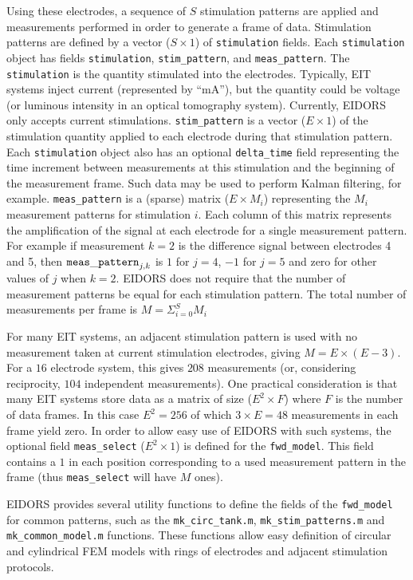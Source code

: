 \documentclass[12pt]{iopart}
\begin{document}
Using these electrodes, a sequence of $S$ stimulation
patterns are applied and measurements performed
in order to generate a frame of data.
Stimulation patterns are defined by a vector
($S\times1$) of {\tt stimulation} fields. Each
{\tt stimulation} object has fields
{\tt stimulation}, 
{\tt stim\_pattern}, and
{\tt meas\_pattern}. The {\tt stimulation} is
the quantity stimulated into the electrodes. Typically,
EIT systems inject current (represented by ``mA''),
but the quantity could be voltage (or luminous
intensity in an optical tomography system). Currently,
EIDORS only accepts current stimulations.
{\tt stim\_pattern} is a vector ($E\times1$)
of the stimulation quantity applied to each electrode
during that stimulation pattern.
Each {\tt stimulation} object also has an optional 
{\tt delta\_time} field representing the time increment
between measurements at this stimulation and the beginning
of the measurement frame. Such data may be used to perform
Kalman filtering, for example.
{\tt meas\_pattern} is a (sparse) matrix ($E{\times}M_i$) 
representing the $M_i$ measurement patterns for
stimulation $i$. Each column of this matrix represents
the amplification of the signal at each electrode for
a single measurement pattern. For example if measurement
$k=2$ is the difference signal between electrodes 4 and 5,
then ${\tt meas\_pattern}_{j,k}$ is $1$ for $j=4$,  $-1$
for $j=5$ and zero for other values of $j$ when $k=2$.
EIDORS does not require that the number of measurement
patterns be equal for each stimulation pattern. 
The total number of measurements per frame is
$ M = \Sigma_{i=0}^{S} M_i$

For many EIT systems, an adjacent stimulation
pattern is used with no measurement taken at current
stimulation electrodes, giving $M = E\times(E-3)$.
For a $16$ electrode system, this gives $208$
measurements (or, considering reciprocity, $104$ independent
measurements). One practical consideration is that
many EIT systems store data as a matrix of size
($E^2{\times}F$) where $F$ is the number of data
frames. In this case $E^2= 256$ of which $3{\times}E = 48$ measurements
in each frame yield zero. In order to allow easy 
use of EIDORS with such systems, the optional
field {\tt meas\_select} ($E^2\times1$) is defined
for the {\tt fwd\_model}. This field contains a 
$1$ in each position corresponding to a used measurement
pattern in the frame (thus {\tt meas\_select} will
have $M$ ones).

EIDORS provides several utility functions to define
the fields of the {\tt fwd\_model} for common 
patterns, such as the
{\tt mk\_circ\_tank.m},
{\tt mk\_stim\_patterns.m} and
{\tt mk\_common\_model.m} functions. These functions
allow easy definition of circular and cylindrical
FEM models with rings of electrodes and adjacent
stimulation protocols.
\end{document}
